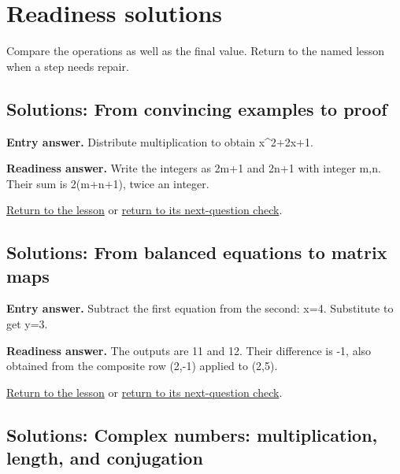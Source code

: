 \chapter{Readiness solutions}

\label{learn:solutions}

Compare the operations as well as the final value. Return to the named lesson when a step needs repair.

\section{Solutions: From convincing examples to proof}

\label{solution:entry:proof}

\textbf{Entry answer.} Distribute multiplication to obtain x\textasciicircum{}2+2x+1.\par

\label{solution:ready:proof}

\textbf{Readiness answer.} Write the integers as 2m+1 and 2n+1 with integer m,n. Their sum is 2(m+n+1), twice an integer.\par

\hyperref[learn:proof]{Return to the lesson} or \hyperref[readiness:proof]{return to its next-question check}.

\section{Solutions: From balanced equations to matrix maps}

\label{solution:entry:matrix_maps}

\textbf{Entry answer.} Subtract the first equation from the second: x=4. Substitute to get y=3.\par

\label{solution:ready:matrix_maps}

\textbf{Readiness answer.} The outputs are 11 and 12. Their difference is -1, also obtained from the composite row (2,-1) applied to (2,5).\par

\hyperref[learn:matrix_maps]{Return to the lesson} or \hyperref[readiness:matrix_maps]{return to its next-question check}.

\section{Solutions: Complex numbers: multiplication, length, and conjugation}

